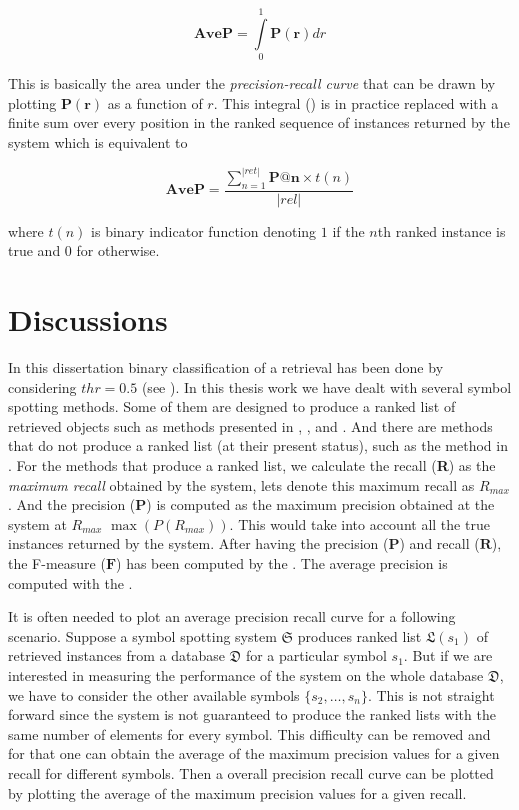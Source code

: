 \begin{equation}
\mathbf{AveP}=\int\limits_0^1 \mathbf{P(r)}dr
\label{eqn:perf-eval:avep1}
\end{equation}

This is basically the area under the \emph{precision-recall curve} that can be drawn by plotting $\mathbf{P(r)}$ as a function of $r$. This integral () is in practice replaced with a finite sum over every position in the ranked sequence of instances returned by the system which is equivalent to 

\begin{equation}
\textbf{AveP}=\frac{\sum_{n=1}^{|ret|}\mathbf{P@n}\times t(n)}{|rel|}
\label{eqn:perf-eval:avep2}
\end{equation}

where $t(n)$ is binary indicator function denoting $1$ if the $n$th ranked instance is true and $0$ for otherwise.

\section{Discussions}
\label{sec:perf-eval:disc}
In this dissertation binary classification of a retrieval has been done by considering $thr=0.5$ (see ). In this thesis work we have dealt with several symbol spotting methods. Some of them are designed to produce a ranked list of retrieved objects such as methods presented in , ,  and \cite{LeBodic2012}. And there are methods that do not produce a ranked list (at their present status), such as the method in . For the methods that produce a ranked list, we calculate the recall (\textbf{R}) as the \emph{maximum recall} obtained by the system, lets denote this maximum recall as $R_{max}$. And the precision (\textbf{P}) is computed as the maximum precision obtained at the system at $R_{max}$ \ie $\max(P(R_{max}))$. This would take into account all the true instances returned by the system. After having the precision ($\mathbf{P}$) and recall ($\mathbf{R}$), the F-measure ($\mathbf{F}$) has been computed by the . The average precision is computed with the .

It is often needed to plot an average precision recall curve for a following scenario. Suppose a symbol spotting system $\mathfrak{S}$ produces ranked list $\mathfrak{L}(s_1)$ of retrieved instances from a database $\mathfrak{D}$ for a particular symbol $s_1$. But if we are interested in measuring the performance of the system on the whole database $\mathfrak{D}$, we have to consider the other available symbols $\lbrace s_2,\ldots,s_n\rbrace$. This is not straight forward since the system is not guaranteed to produce the ranked lists with the same number of elements for every symbol. This difficulty can be removed and for that one can obtain the average of the maximum precision values for a given recall for different symbols. Then a overall precision recall curve can be plotted by plotting the average of the maximum precision values for a given recall.